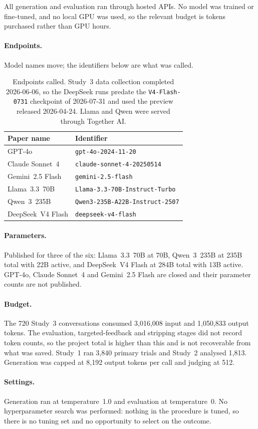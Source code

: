 All generation and evaluation ran through hosted APIs. No model was trained or fine-tuned, and
no local GPU was used, so the relevant budget is tokens purchased rather than GPU hours.

\paragraph{Endpoints.} Model names move; the identifiers below are what was called.

\begin{table}[h]
\centering
\small
\begin{tabular}{@{}ll@{}}
\toprule
\textbf{Paper name} & \textbf{Identifier} \\
\midrule
GPT-4o & \texttt{gpt-4o-2024-11-20} \\
Claude Sonnet~4 & \texttt{claude-sonnet-4-20250514} \\
Gemini~2.5 Flash & \texttt{gemini-2.5-flash} \\
Llama~3.3~70B & \texttt{Llama-3.3-70B-Instruct-Turbo} \\
Qwen~3~235B & \texttt{Qwen3-235B-A22B-Instruct-2507} \\
DeepSeek~V4 Flash & \texttt{deepseek-v4-flash} \\
\bottomrule
\end{tabular}
\caption{Endpoints called. Study~3 data collection completed 2026-06-06, so the DeepSeek runs
predate the \texttt{V4-Flash-0731} checkpoint of 2026-07-31 and used the preview released
2026-04-24. Llama and Qwen were served through Together AI.}
\label{tab:endpoints}
\end{table}

\paragraph{Parameters.} Published for three of the six: Llama~3.3~70B at 70B, Qwen~3~235B at
235B total with 22B active, and DeepSeek~V4 Flash at 284B total with 13B active. GPT-4o,
Claude Sonnet~4 and Gemini~2.5 Flash are closed and their parameter counts are not published.

\paragraph{Budget.} The 720 Study~3 conversations consumed 3,016,008 input and 1,050,833
output tokens. The evaluation, targeted-feedback and stripping stages did not record token
counts, so the project total is higher than this and is not recoverable from what was saved.
Study~1 ran 3,840 primary trials and Study~2 analysed 1,813. Generation was capped at 8,192
output tokens per call and judging at 512.

\paragraph{Settings.} Generation ran at temperature~1.0 and evaluation at temperature~0. No
hyperparameter search was performed: nothing in the procedure is tuned, so there is no tuning
set and no opportunity to select on the outcome.
